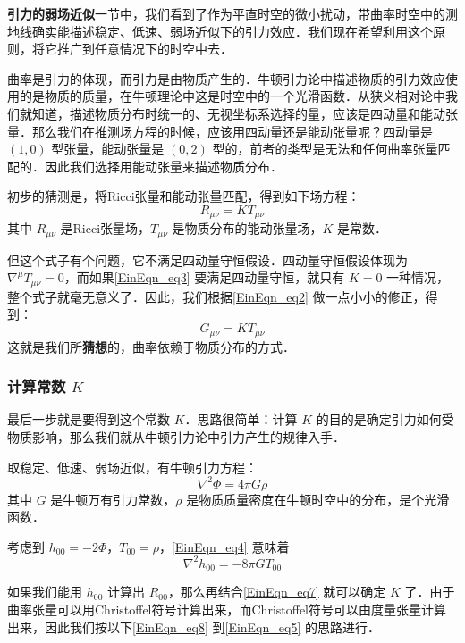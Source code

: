 \textbf{引力的弱场近似}一节中，我们看到了作为平直时空的微小扰动，带曲率时空中的测地线确实能描述稳定、低速、弱场近似下的引力效应．我们现在希望利用这个原则，将它推广到任意情况下的时空中去．

曲率是引力的体现，而引力是由物质产生的．牛顿引力论中描述物质的引力效应使用的是物质的质量，在牛顿理论中这是时空中的一个光滑函数．从狭义相对论中我们就知道，描述物质分布时统一的、无视坐标系选择的量，应该是四动量和能动张量．那么我们在推测场方程的时候，应该用四动量还是能动张量呢？四动量是 $(1, 0)$ 型张量，能动张量是 $(0, 2)$ 型的，前者的类型是无法和任何曲率张量匹配的．因此我们选择用能动张量来描述物质分布．

初步的猜测是，将Ricci张量和能动张量匹配，得到如下场方程：
\begin{equation}\label{EinEqn_eq3}
R_{\mu\nu}=KT_{\mu\nu}
\end{equation}
其中 $R_{\mu\nu}$ 是Ricci张量场，$T_{\mu\nu}$ 是物质分布的能动张量场，$K$ 是常数．

但这个式子有个问题，它不满足四动量守恒假设．四动量守恒假设体现为 $\nabla^\mu T_{\mu\nu}=0$，而如果\autoref{EinEqn_eq3} 要满足四动量守恒，就只有 $K=0$ 一种情况，整个式子就毫无意义了．因此，我们根据\autoref{EinEqn_eq2} 做一点小小的修正，得到：
\begin{equation}
G_{\mu\nu}=KT_{\mu\nu}
\end{equation}
这就是我们所\textbf{猜想}的，曲率依赖于物质分布的方式．



\subsubsection{计算常数 $K$}


最后一步就是要得到这个常数 $K$．思路很简单：计算 $K$ 的目的是确定引力如何受物质影响，那么我们就从牛顿引力论中引力产生的规律入手．

取稳定、低速、弱场近似，有牛顿引力方程：
\begin{equation}\label{EinEqn_eq4}
\nabla^2\Phi=4\pi G\rho
\end{equation}
其中 $G$ 是牛顿万有引力常数，$\rho$ 是物质质量密度在牛顿时空中的分布，是个光滑函数．

考虑到 $h_{00}=-2\Phi$，$T_{00}=\rho$，\autoref{EinEqn_eq4} 意味着
\begin{equation}\label{EinEqn_eq7}
\nabla^2h_{00}=-8\pi G T_{00}
\end{equation}



如果我们能用 $h_{00}$ 计算出 $R_{00}$，那么再结合\autoref{EinEqn_eq7} 就可以确定 $K$ 了．由于曲率张量可以用Christoffel符号计算出来，而Christoffel符号可以由度量张量计算出来，因此我们按以下\autoref{EinEqn_eq8} 到\autoref{EinEqn_eq5} 的思路进行．

